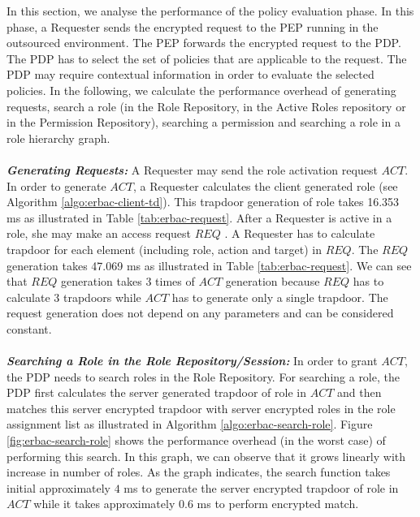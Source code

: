 \documentclass[epsfig,a4paper,11pt,titlepage]{book}
\numberwithin{algorithm}{chapter}
\begin{document}
In this section, we analyse the performance of the policy evaluation phase. In this phase, a Requester sends the encrypted request to the \gls{PEP} running in the outsourced environment. The \gls{PEP} forwards the encrypted request to the \gls{PDP}. The \gls{PDP} has to select the set of policies that are applicable to the request. The \gls{PDP} may require contextual information in order to evaluate the selected policies. In the following, we calculate the performance overhead of generating requests, search a role (in the Role Repository, in the Active Roles repository or in the Permission Repository), searching a permission and searching a role in a role hierarchy graph. \\ \\
\noindent \emph{\textbf{Generating Requests:}}
A Requester may send the role activation request $\mathit{ACT}$. In order to generate $\mathit{ACT}$, a Requester calculates the client generated role (see Algorithm \ref{algo:erbac-client-td}). This trapdoor generation of role takes 16.353 \gls{ms} as illustrated in Table \ref{tab:erbac-request}. After a Requester is active in a role, she may make an access request $\mathit{REQ}$ . A Requester has to calculate trapdoor for each element (including role, action and target) in $\mathit{REQ}$. The $\mathit{REQ}$ generation takes 47.069 \gls{ms} as illustrated in Table \ref{tab:erbac-request}. We can see that $\mathit{REQ}$ generation takes 3 times of $\mathit{ACT}$ generation because $\mathit{REQ}$ has to calculate 3 trapdoors while $\mathit{ACT}$ has to generate only a single trapdoor. The request generation does not depend on any parameters and can be considered constant. \\ \\
\noindent \emph{\textbf{Searching a Role in the Role Repository/Session:}}
In order to grant $\mathit{ACT}$, the \gls{PDP} needs to search roles in the Role Repository. For searching a role, the \gls{PDP} first calculates the server generated trapdoor of role in $\mathit{ACT}$ and then matches this server encrypted trapdoor with server encrypted roles in the role assignment list as illustrated in Algorithm \ref{algo:erbac-search-role}. Figure \ref{fig:erbac-search-role} shows the performance overhead (in the worst case) of performing this search. In this graph, we can observe that it grows linearly with increase in number of roles. As the graph indicates, the search function takes initial approximately $4$ \gls{ms} to generate the server encrypted trapdoor of role in $\mathit{ACT}$ while it takes approximately $0.6$ \gls{ms} to perform encrypted match.
\end{document}
